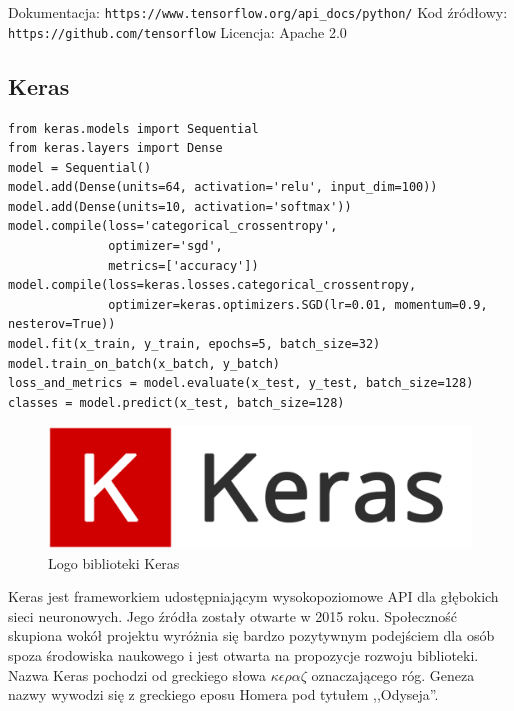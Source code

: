 \documentclass[12pt,a4paper,twoside,titlepage,openright]{book}
\begin{document}
\noindent
\newline 
Dokumentacja: \texttt{https://www.tensorflow.org/api\_docs/python/}
\newline 
Kod źródłowy: \texttt{https://github.com/tensorflow}
\newline 
Licencja: Apache 2.0

\subsection{Keras}


\noindent
\begin{minipage}{\linewidth}
\begin{lstlisting}[caption=Skrypt najprostszego modelu sekwencyjnego (Keras w 30 sekund), label=lst:test]
from keras.models import Sequential
from keras.layers import Dense
model = Sequential()
model.add(Dense(units=64, activation='relu', input_dim=100))
model.add(Dense(units=10, activation='softmax'))
model.compile(loss='categorical_crossentropy',
              optimizer='sgd',
              metrics=['accuracy'])
model.compile(loss=keras.losses.categorical_crossentropy,
              optimizer=keras.optimizers.SGD(lr=0.01, momentum=0.9, nesterov=True))
model.fit(x_train, y_train, epochs=5, batch_size=32)
model.train_on_batch(x_batch, y_batch)
loss_and_metrics = model.evaluate(x_test, y_test, batch_size=128)
classes = model.predict(x_test, batch_size=128)
\end{lstlisting}
\end{minipage}

\begin{figure}[ht]
	\centering
			\includegraphics[resolution=100, scale=0.3]{Keras.png}
		\caption{Logo biblioteki Keras}
\end{figure}

Keras jest frameworkiem udostępniającym wysokopoziomowe API dla głębokich sieci neuronowych. Jego źródła zostały otwarte w 2015 roku. Społeczność skupiona wokół projektu wyróżnia się bardzo pozytywnym podejściem dla osób spoza środowiska naukowego i jest otwarta na propozycje rozwoju biblioteki. Nazwa Keras pochodzi od greckiego słowa \(\kappa\epsilon\rho\alpha\zeta\) oznaczającego róg. Geneza nazwy wywodzi się z greckiego eposu Homera pod tytułem ,,Odyseja''.
\end{document}
